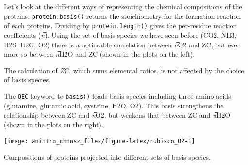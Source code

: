 \documentclass[]{tufte-book}
\begin{document}
Let's look at the different ways of representing the chemical
compositions of the proteins. {\texttt{protein.basis()}} returns the
stoichiometry for the formation reaction of each proteins. Dividing by
{\texttt{protein.length()}} gives the per-residue reaction coefficients
(\emph{n}̅). Using the set of basis species we have seen before (CO2,
NH3, H2S, H2O, O2) there is a noticeable correlation between \emph{n}̅O2
and ZC, but even more so between \emph{n}̅H2O and ZC (shown in the plots
on the left).

\begin{marginfigure}
The calculation of \emph{Z}C, which sums elemental ratios, is not
affected by the choice of basis species.
\end{marginfigure}

The \texttt{QEC} keyword to {\texttt{basis()}} loads basis species
including three amino acids (glutamine, glutamic acid, cysteine, H2O,
O2). This basis strengthens the relationship between ZC and \emph{n}̅O2,
but weakens that between ZC and \emph{n}̅H2O (shown in the plots on the
right).

\begin{marginfigure}
\texttt{[image: anintro\_chnosz\_files/figure-latex/rubisco\_O2-1]} \caption[Compositions of proteins projected into different sets of basis species]{Compositions of proteins projected into different sets of basis species.}\label{fig:rubisco_O2}
\end{marginfigure}
\end{document}
